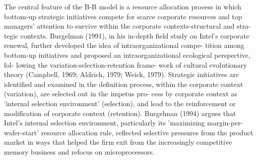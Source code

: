 \documentclass[12pt,letterpaper]{article}
\begin{document}
The central feature of the B-B model is a resource allocation process in which bottom-up strategic initiatives compete for scarce corporate resources and top managers' attention to survive within the corporate contexts-structural and stra- tegic contexts. Burgelman (1991), in his in-depth field study on Intel's corporate renewal, further developed the idea of intraorganizational compe- tition among bottom-up initiatives and proposed an intraorganizational ecological perspective, fol- lowing the variation-selection-retention frame- work of cultural evolutionary theory (Campbell, 1969; Aldrich, 1979; Weick, 1979). Strategic initiatives are identified and examined in the definition process, within the corporate context (variation), are selected out in the impetus pro- cess by corporate context as 'internal selection environment' (selection), and lead to the reinforcement or modification of corporate context (retention). Burgelman (1994) argues that Intel's internal selection environment, particularly its 'maximizing margin-per-wafer-start' resource allocation rule, reflected selective pressures from the product market in ways that helped the firm exit from the increasingly competitive memory business and refocus on microprocessors.

\begin{singlespace}
\renewcommand{\refname}{REFERENCES}
 

\end{singlespace}
\end{document}
